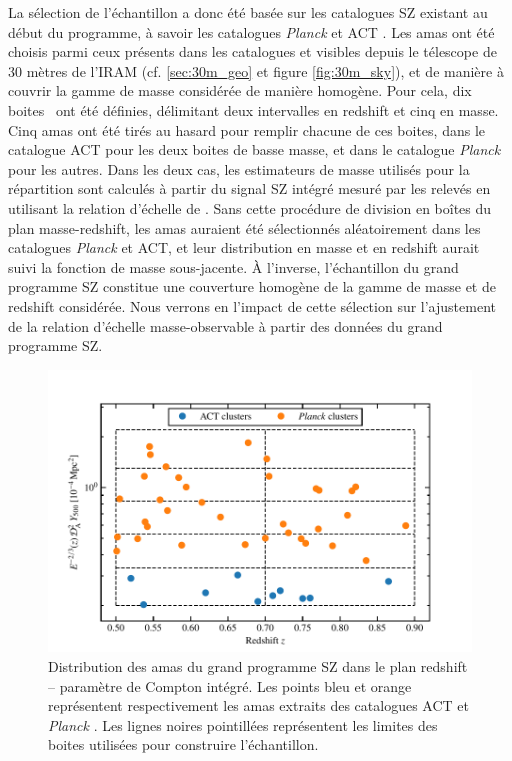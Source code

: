 La sélection de l'échantillon a donc été basée sur les catalogues SZ existant au début du programme, à savoir les catalogues \textit{Planck} et ACT \cite{planck_collaboration_planck_2016-2, hasselfield_atacama_2013}.
Les amas ont été choisis parmi ceux présents dans les catalogues et visibles depuis le télescope de 30 mètres de l'IRAM (cf. \ref{sec:30m_geo} et figure \ref{fig:30m_sky}), et de manière à couvrir la gamme de masse considérée de manière homogène.
Pour cela, dix \guillemotleft boites \guillemotright\ ont été définies, délimitant deux intervalles en redshift et cinq en masse.
Cinq amas ont été tirés au hasard pour remplir chacune de ces boites, dans le catalogue ACT pour les deux boites de basse masse, et dans le catalogue \textit{Planck} pour les autres.
Dans les deux cas, les estimateurs de masse utilisés pour la répartition sont calculés à partir du signal SZ intégré mesuré par les relevés en utilisant la relation d'échelle de \cite{arnaud_universal_2010}.
Sans cette procédure de division en boîtes du plan masse-redshift, les amas auraient été sélectionnés aléatoirement dans les catalogues \textit{Planck} et ACT, et leur distribution en masse et en redshift aurait suivi la fonction de masse sous-jacente.
À l'inverse, l'échantillon du grand programme SZ constitue une couverture homogène de la gamme de masse et de redshift considérée.
Nous verrons en  l'impact de cette sélection sur l'ajustement de la relation d'échelle masse-observable à partir des données du grand programme SZ.

\begin{figure}[t]
    \centering
    \includegraphics[width=.8\linewidth]{Figures/Chap_nk/lpsz_sample.pdf}
    \caption{
        Distribution des amas du grand programme SZ dans le plan redshift -- paramètre de Compton intégré.
        Les points bleu et orange représentent respectivement les amas extraits des catalogues ACT \cite{hasselfield_atacama_2013} et \textit{Planck} \cite{planck_collaboration_planck_2016-2}.
        Les lignes noires pointillées représentent les limites des boites utilisées pour construire l'échantillon.
    }
    \label{fig:lpsz_sample}
\end{figure}

